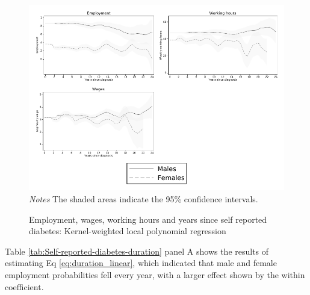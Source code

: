 \documentclass[12pt,english]{article}
\begin{document}
\begin{figure}[!ht]
	\caption{\label{fig:Kernel-weighted-local-polynomial_comb}Employment, wages, working hours and years since self reported diabetes:  Kernel-weighted local polynomial regression}%
	\begin{center}
		\includegraphics[width=\linewidth]{figures/lpoly_combined.pdf}\\
		\footnotesize{\textit{Notes} The shaded areas indicate the 95\% confidence intervals.}
	\end{center}
\end{figure}


Table \ref{tab:Self-reported-diabetes-duration} panel A shows the results of estimating Eq \ref{eq:duration_linear}, which indicated that male and female employment probabilities fell every year, with a larger effect shown by the within coefficient. 
\end{document}

